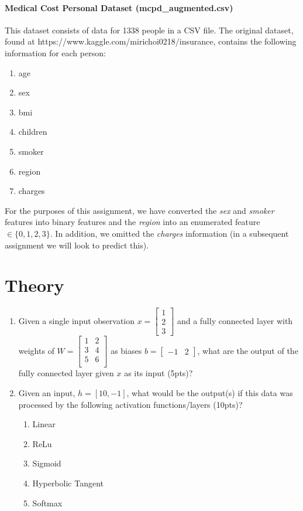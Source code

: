 \documentclass[12pt]{article}
\begin{document}
\paragraph{Medical Cost Personal Dataset  (mcpd\_augmented.csv)}
This dataset consists of data for 1338 people in a CSV file.  The original dataset, found at https://www.kaggle.com/mirichoi0218/insurance, contains the following information for each person:

\begin{enumerate}
\item age
\item sex
\item bmi
\item children
\item smoker
\item region
\item charges
\end{enumerate}

\noindent
For the purposes of this assignment, we have converted the \emph{sex} and \emph{smoker} features into binary features and the \emph{region} into an enumerated feature $\in \{0,1,2,3\}$.   In addition, we omitted the \emph{charges} information (in a subsequent assignment we will look to predict this).


\newpage
\section{Theory}
\begin{enumerate}
\item Given a single input observation $x=\begin{bmatrix}1\\2\\3\end{bmatrix}$ and a fully connected layer with weights of $W=\begin{bmatrix}
1 & 2\\
3 & 4\\
5 & 6\\
\end{bmatrix}$  as biases $b=\begin{bmatrix}-1 & 2\end{bmatrix}$, what are the output of the fully connected layer given $x$ as its input (5pts)?

\item Given an input, $h=[10,-1]$, what would be the output(s) if this data was processed by the following activation functions/layers (10pts)? 
\begin{enumerate}
\item Linear
\item ReLu
\item Sigmoid
\item Hyperbolic Tangent
\item Softmax
\end{enumerate}

\end{enumerate}
\end{document}
